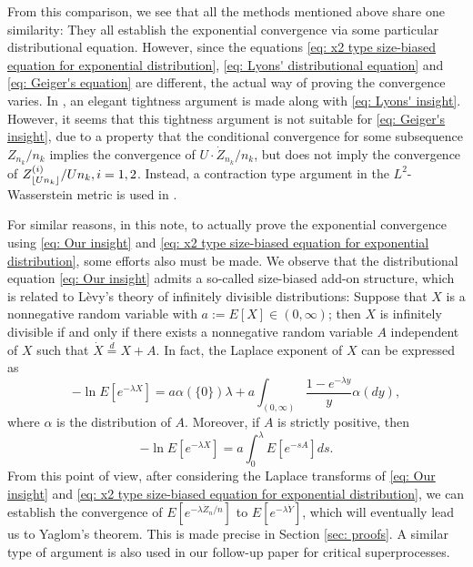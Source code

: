 \documentclass[12pt,a4paper]{amsart}
\DeclarePairedDelimiter\floor{\lfloor}{\rfloor}
\numberwithin{equation}{section}
\begin{document}
	From this comparison, we see that all the methods mentioned above share one similarity: They all establish the exponential convergence via some particular distributional equation.
	However, since the equations \eqref{eq: x2 type size-biased equation for exponential distribution}, \eqref{eq: Lyons' distributional equation} and \eqref{eq: Geiger's equation} are different, the actual way of proving the convergence varies.
	In \cite{lyons1995conceptual}, an elegant tightness argument is made along with \eqref{eq: Lyons' insight}.
	However, it seems that this tightness argument is not suitable for \eqref{eq: Geiger's insight}, due to a property that the conditional convergence for some subsequence $Z_{n_k}/n_k$ implies the convergence of $U \cdot \dot Z_{n_k}/n_k$,
   	but does not imply
   	the convergence of $Z^{(i)}_{ \floor{Un_k}}/Un_k, i=1, 2$.
	Instead, a contraction type argument in the $L^2$-Wasserstein metric 
	is used in \cite{geiger2000new}.
	
	For similar reasons,
	in this note,
	to actually prove the exponential convergence using \eqref{eq: Our insight} and \eqref{eq: x2 type size-biased equation for exponential distribution}, some efforts also must be made.
	We observe that the distributional equation \eqref{eq: Our insight} admits
    a so-called size-biased add-on structure, which is related to L\`evy's
	theory of infinitely divisible distributions: Suppose that $X$ is a nonnegative random variable with 
	$ a := E [X]\in (0,\infty)$; then 
	$X$ is infinitely divisible if and only if there exists a nonnegative random variable $A$ independent of $X$ such that $\dot X 	\overset{d} = X + A$.
	In fact,
	the Laplace exponent of $X$ can be expressed as
\[
	-\ln E[ e^{-\lambda X}]
	 =  a \alpha(\{0\}) \lambda+ a \int_{(0,\infty)} \frac{1 - e^{-\lambda y}}{y} \alpha(dy),
\]
	where $\alpha$ is the distribution of $A$.
	Moreover, if $A$ is strictly positive, then
\begin{equation}\label{eq: Laplace exponent for size-biased add-on equation}
	-\ln E[ e^{-\lambda X}]
	=  a  \int_0^\lambda E [e^{-s A}] ds.
\end{equation}
	From this point of view, after considering the Laplace transforms of 
	\eqref{eq: Our insight} and \eqref{eq: x2 type size-biased equation for exponential distribution}, we can establish the convergence of $E[e^{-\lambda \dot Z_n/n}]$ to $E[e^{-\lambda \dot {Y}}]$, which will eventually lead us to Yaglom's theorem.
	This is made precise in Section \ref{sec: proofs}.
	A similar type of argument is also  used in our
	follow-up
	paper \cite{RenSongSun2017Spine} for critical superprocesses.
	
\end{document}
